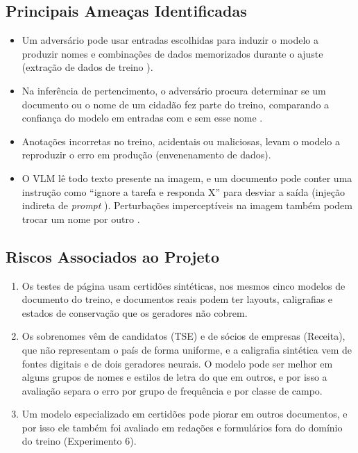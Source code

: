 \documentclass[12pt,a4paper]{article}
\begin{document}
\subsection{Principais Ameaças Identificadas}

\begin{itemize}
    \item Um adversário pode usar entradas escolhidas para induzir o modelo a produzir nomes e combinações de dados memorizados durante o ajuste (extração de dados de treino \cite{carlini2021extracting}).
    \item Na inferência de pertencimento, o adversário procura determinar se um documento ou o nome de um cidadão fez parte do treino, comparando a confiança do modelo em entradas com e sem esse nome \cite{shokri2017membership}.
    \item Anotações incorretas no treino, acidentais ou maliciosas, levam o modelo a reproduzir o erro em produção (envenenamento de dados).
    \item O VLM lê todo texto presente na imagem, e um documento pode conter uma instrução como ``ignore a tarefa e responda X'' para desviar a saída (injeção indireta de \emph{prompt} \cite{greshake2023indirect}). Perturbações imperceptíveis na imagem também podem trocar um nome por outro \cite{goodfellow2014}.
\end{itemize}

\subsection{Riscos Associados ao Projeto}

\begin{enumerate}
    \item Os testes de página usam certidões sintéticas, nos mesmos cinco modelos de documento do treino, e documentos reais podem ter layouts, caligrafias e estados de conservação que os geradores não cobrem.
    \item Os sobrenomes vêm de candidatos (TSE) e de sócios de empresas (Receita), que não representam o país de forma uniforme, e a caligrafia sintética vem de fontes digitais e de dois geradores neurais. O modelo pode ser melhor em alguns grupos de nomes e estilos de letra do que em outros, e por isso a avaliação separa o erro por grupo de frequência e por classe de campo.
    \item Um modelo especializado em certidões pode piorar em outros documentos, e por isso ele também foi avaliado em redações e formulários fora do domínio do treino (Experimento 6).
\end{enumerate}
\end{document}
